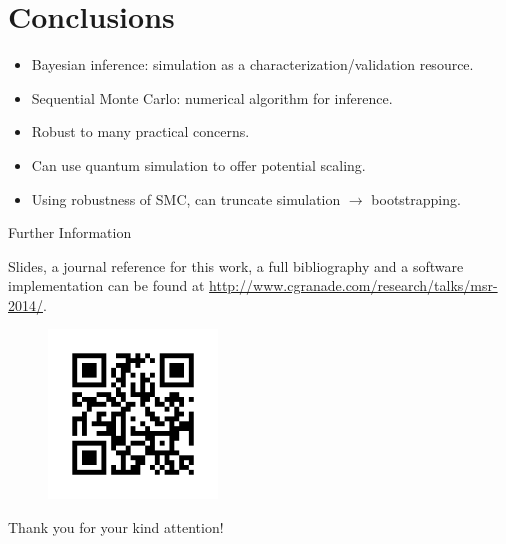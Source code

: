 \documentclass[xcolor=dvipsnames, compress]{beamer}
\begin{document}
\section{Conclusions}


\begin{frame}{}

  \begin{itemize}
   \item<+-> Bayesian inference: simulation as a characterization/validation resource.
   \item<+-> Sequential Monte Carlo: numerical algorithm for inference.
   \item<+-> Robust to many practical concerns.
   \item<+-> Can use quantum simulation to offer potential scaling.
   \item<+-> Using robustness of SMC, can truncate simulation $\to$ bootstrapping.
  \end{itemize}

\end{frame}

\begin{frame}{Further Information}

  Slides, a journal reference for this work, a full bibliography and a software implementation can
  be found at \url{http://www.cgranade.com/research/talks/msr-2014/}.

  \begin{figure}
     \includegraphics[width=0.4\textwidth]{link}
  \end{figure}

  \begin{block}{}
    Thank you for your kind attention!
  \end{block}
\end{frame}


  
\end{document}
